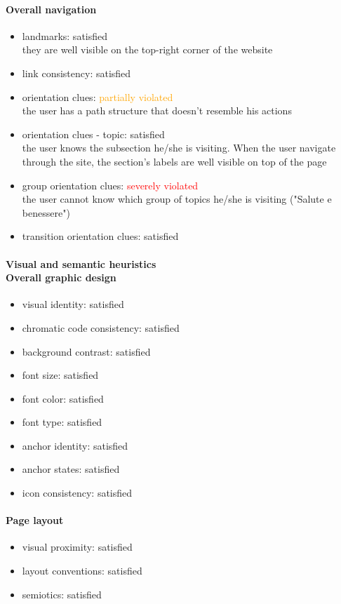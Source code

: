 \begin{enumerate}
	\paragraph*{Overall navigation}
	\begin{itemize}
		\item landmarks: satisfied\\
		they are well visible on the top-right corner of the website
		\item link consistency: satisfied
		\item orientation clues: \textcolor{orange}{partially violated}\\
		the user has a path structure that doesn't resemble his actions
		\item orientation clues - topic: satisfied\\
		the user knows the subsection he/she is visiting. When the user navigate through the site, the section's labels are well visible on top of the page
		\item group orientation clues: \textcolor{red}{severely violated}\\
		the user cannot know which group of topics he/she is visiting ("Salute e benessere")
		\item transition orientation clues: satisfied
	\end{itemize}	

	\paragraph*{Visual and semantic heuristics \\ Overall graphic design }
	\begin{itemize}
		\item visual identity: satisfied
		\item chromatic code consistency: satisfied
		\item background contrast: satisfied
		\item font size: satisfied
		\item font color: satisfied
		\item font type: satisfied
		\item anchor identity: satisfied
		\item anchor states: satisfied
		\item icon consistency: satisfied
	\end{itemize}

	\paragraph*{Page layout}
	\begin{itemize}
		\item visual proximity: satisfied
		\item layout conventions: satisfied
		\item semiotics: satisfied
	\end{itemize}


\end{enumerate}
